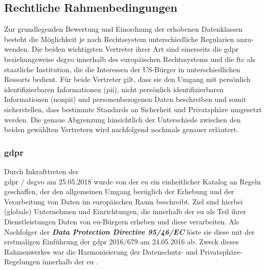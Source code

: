\subsection{Rechtliche Rahmenbedingungen}
\label{sec:Grundlagen:ssec:Rechtliche Rahmenbedingungen}

Zur grundlegenden Bewertung und Einordnung der erhobenen Datenklassen besteht die Möglichkeit je nach Rechtssystem unterschiedliche Regularien anzu-wenden. Die beiden wichtigsten Vertreter ihrer Art sind einerseits die \acl{gdpr} beziehungsweise \acl{dsgvo} innerhalb des europäischen Rechtssystems und die \acl{ftc} als staatliche Institution, die die Interessen der US-Bürger in unterschiedlichen Ressorts bedient. 
Für beide Vertreter gilt, dass sie den Umgang mit persönlich identifizierbaren Informationen (\acs{pii}), nicht persönlich identifizierbaren Informationen (\acs{nonpii}) und personenbezogenen Daten beschreiben und somit sicherstellen, dass bestimmte Standards an Sicherheit und Privatsphäre umgesetzt werden. Die genaue Abgrenzung hinsichtlich der Unterschiede zwischen den beiden gewählten Vertretern wird nachfolgend nochmals genauer erläutert.

\subsubsection{\acl{gdpr}}
\label{sec:Grundlagen:ssec:Rechtliche Rahmenbedingungen:sssec:GDPR}

Durch Inkrafttreten der \\ \ac{gdpr} / \ac{dsgvo} am 25.05.2018 wurde von der \acl{eu} ein einheitlicher Katalog an Regeln geschaffen, der den allgemeinen Umgang bezüglich der Erhebung und der Verarbeitung von Daten im europäischen Raum beschreibt. 
Ziel sind hierbei (globale) Unternehmen und Einrichtungen, die innerhalb der \acl{eu} als Teil ihrer Dienstleistungen Daten von \acs{eu}-Bürgern erheben und diese verarbeiten. Als Nachfolger der \textbf{\textit{Data Protection Directive 95/46/EC}} löste sie diese mit der erstmaligen Einführung der \ac{gdpr} 2016/679 am 24.05.2016 ab. 
Zweck dieses Rahmenwerkes war die Harmonisierung der Datenschutz- und Privatsphäre-Regelungen innerhalb der \acl{eu} \cite{Bastos2019}.

